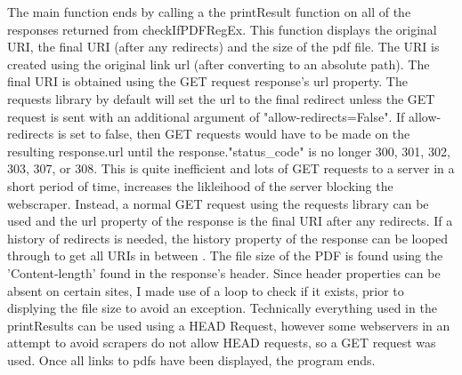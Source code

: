 \documentclass[12pt]{article}
\begin{document}
The main function ends by calling a the printResult function on all of the responses returned from checkIfPDFRegEx. This function displays the original URI, the final URI (after any redirects) and the size of the pdf file. The URI is created using the original link url (after converting to an absolute path). The final URI is obtained using the GET request response's url property. The requests library by default will set the url to the final redirect unless the GET request is sent with an additional argument of "allow-redirects=False". If allow-redirects is set to false, then GET requests would have to be made on the resulting response.url until the response."status\_code" is no longer 300, 301, 302, 303, 307, or 308. This is quite inefficient and lots of GET requests to a server in a short period of time, increases the likleihood of the server blocking the webscraper. Instead, a normal GET request using the requests library can be used and the url property of the response is the final URI after any redirects. If a history of redirects is needed, the history property of the response can be looped through to get all URIs in between \cite{stackOverflowRedirects}. The file size of the PDF is found using the 'Content-length'  found in the response's header.  Since header properties can be absent on certain sites, I made use of a loop to check if it exists, prior to displying the file size to avoid an exception. Technically everything used in the printResults  can be used using a HEAD Request, however some webservers in an attempt to avoid scrapers do not allow HEAD requests, so a GET request was used. Once all links to pdfs have been displayed, the program ends. 
\end{document}
